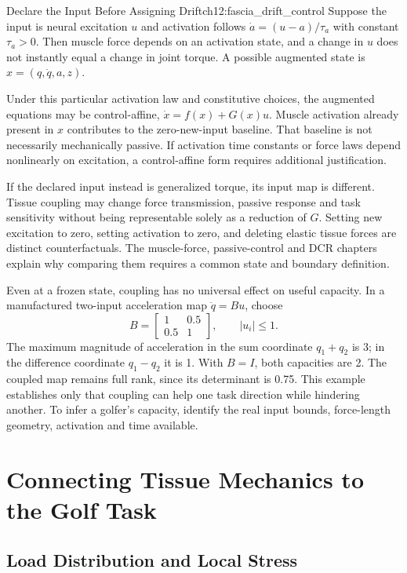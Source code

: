 \begin{principle}{Declare the Input Before Assigning Drift}{ch12:fascia_drift_control}
Suppose the input is neural excitation $u$ and activation follows $\dot a=(u-a)/\tau_a$ with constant $\tau_a>0$. Then muscle force depends on an activation state, and a change in $u$ does not instantly equal a change in joint torque. A possible augmented state is $x=(q,\dot q,a,z)$.

Under this particular activation law and constitutive choices, the augmented equations may be control-affine, $\dot x=f(x)+G(x)u$. Muscle activation already present in $x$ contributes to the zero-new-input baseline. That baseline is not necessarily mechanically passive. If activation time constants or force laws depend nonlinearly on excitation, a control-affine form requires additional justification.

If the declared input instead is generalized torque, its input map is different. Tissue coupling may change force transmission, passive response and task sensitivity without being representable solely as a reduction of $G$. Setting new excitation to zero, setting activation to zero, and deleting elastic tissue forces are distinct counterfactuals. The muscle-force, passive-control and DCR chapters explain why comparing them requires a common state and boundary definition.
\end{principle}

Even at a frozen state, coupling has no universal effect on useful capacity. In a manufactured two-input acceleration map $\ddot q=Bu$, choose
\[
B=\begin{bmatrix}1&0.5\\0.5&1\end{bmatrix},\qquad |u_i|\leq1.
\]
The maximum magnitude of acceleration in the sum coordinate $q_1+q_2$ is 3; in the difference coordinate $q_1-q_2$ it is 1. With $B=I$, both capacities are 2. The coupled map remains full rank, since its determinant is 0.75. This example establishes only that coupling can help one task direction while hindering another. To infer a golfer's capacity, identify the real input bounds, force-length geometry, activation and time available.

\section{Connecting Tissue Mechanics to the Golf Task}

\subsection{Load Distribution and Local Stress}

